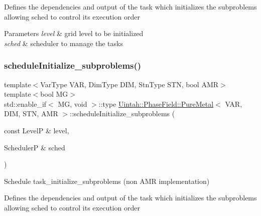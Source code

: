 Defines the dependencies and output of the task which initializes the subproblems allowing sched to control its execution order


\begin{DoxyParams}{Parameters}
{\em level} & grid level to be initialized \\
\hline
{\em sched} & scheduler to manage the tasks \\
\hline
\end{DoxyParams}
\mbox{\label{classUintah_1_1PhaseField_1_1PureMetal_a1ec4eefc3acacbabe19312052f373141}} 
\subsubsection{\texorpdfstring{schedule\+Initialize\+\_\+subproblems()}{scheduleInitialize\_subproblems()}\hspace{0.1cm}{\footnotesize\ttfamily [1/2]}}
{\footnotesize\ttfamily template$<$Var\+Type V\+AR, Dim\+Type D\+IM, Stn\+Type S\+TN, bool A\+MR$>$ \\
template$<$bool MG$>$ \\
std\+::enable\+\_\+if$<$ MG, void $>$\+::type \hyperlink{classUintah_1_1PhaseField_1_1PureMetal}{Uintah\+::\+Phase\+Field\+::\+Pure\+Metal}$<$ V\+AR, D\+IM, S\+TN, A\+MR $>$\+::schedule\+Initialize\+\_\+subproblems (\begin{DoxyParamCaption}\item[{const LevelP \&}]{level,  }\item[{SchedulerP \&}]{sched }\end{DoxyParamCaption})\hspace{0.3cm}{\ttfamily [protected]}}



Schedule task\+\_\+initialize\+\_\+subproblems (non A\+MR implementation) 

Defines the dependencies and output of the task which initializes the subproblems allowing sched to control its execution order


